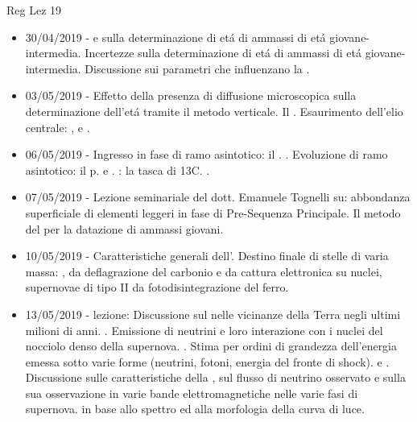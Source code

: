 \begin{frame}[allowframebreaks]{Reg Lez 19}
\begin{itemize}
\item 30/04/2019 -  e sulla determinazione di et\'a di ammassi di et\'a giovane-intermedia. Incertezze sulla determinazione di et\'a di ammassi di et\'a giovane-intermedia. Discussione sui parametri che influenzano la .
\item 03/05/2019 - Effetto della presenza di diffusione microscopica sulla determinazione dell'et\'a tramite il metodo verticale. Il . Esaurimento dell'elio centrale: ,  e .
\item 06/05/2019 - Ingresso in fase di ramo asintotico: il . . Evoluzione di ramo asintotico: il p.  e . : la tasca di 13C. .
\item 07/05/2019 - Lezione seminariale del dott. Emanuele Tognelli su: abbondanza superficiale di elementi leggeri in fase di Pre-Sequenza Principale. Il metodo del  per la datazione di ammassi giovani.
\item 10/05/2019 - Caratteristiche generali dell'. Destino finale di stelle di varia massa: ,  da deflagrazione del carbonio e da cattura elettronica su nuclei, supernovae di tipo II da fotodisintegrazione del ferro.
\item 13/05/2019 - lezione: Discussione sul  nelle vicinanze della Terra negli ultimi milioni di anni. . Emissione di neutrini e loro interazione con i nuclei del nocciolo denso della supernova. . Stima per ordini di grandezza dell'energia emessa sotto varie forme (neutrini, fotoni, energia del fronte di shock).  e . Discussione sulle caratteristiche della , sul flusso di neutrino osservato e sulla sua osservazione in varie bande elettromagnetiche nelle varie fasi di supernova.  in base allo spettro ed alla morfologia della curva di luce.

\end{itemize}
\end{frame}
